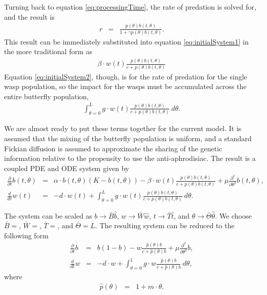 \documentclass[12pt]{article}
\begin{document}
Turning back to equation \ref{eq:processingTime}, the rate of
predation is solved for, and the result is
\begin{eqnarray}
  \label{eq:rateOfPredation}
  r & = &  \frac{p(\theta) b(t,\theta) }{1 + \gamma p(\theta) b(t,\theta)}.
\end{eqnarray}
This result can be immediately substituted into equation
\ref{eq:initialSystem1} in the more traditional form as
\begin{eqnarray}
  \label{eq:butterflyPredationRate}
  \beta \cdot w(t) \frac{p(\theta) b(t,\theta) }{c +  p(\theta) b(t,\theta)}
\end{eqnarray}
Equation \ref{eq:initialSystem2}, though, is for the rate of predation
for the single wasp population, so the impact for the wasps must be
accumulated across the entire butterfly population,
\begin{eqnarray}
  \label{eq:waspPredationRate}
  \int^L_{\theta=0} g \cdot w(t) \frac{p(\theta) b(t,\theta) }{c + p(\theta) b(t,\theta)} ~ d\theta.
\end{eqnarray}

We are almost ready to put these terms together for the current
model. It is assumed that the mixing of the butterfly population is
uniform, and a standard Fickian diffusion is assumed to approximate
the sharing of the genetic information relative to the propensity to
use the anti-aphrodisiac. The result is a coupled PDE and ODE system
given by 
\begin{eqnarray}
  \label{eq:odePDE1}
  \frac{\partial}{\partial t} b(t,\theta) & = &
      \alpha \cdot b(t,\theta) (K - b(t,\theta))
      - \beta \cdot w(t) \frac{p(\theta) b(t,\theta)}{c+p(\theta)b(t,\theta)}
      + \mu \frac{\partial^2}{\partial \theta^2} b(t,\theta) , \\
  \label{eq:odePDE2}
  \frac{d}{dt} w(t) & = & -d \cdot w(t) +
      \int^L_{\theta=0} g \cdot w(t) \frac{p(\theta) b(t,\theta) }{c + p(\theta) b(t,\theta)} ~ d\theta.
\end{eqnarray}

The system can be scaled as $b\rightarrow \bar{B}\hat{b}$,
$w\rightarrow \bar{W}\hat{w}$, $t\rightarrow \bar{T}\hat{t}$, and
$\theta\rightarrow \bar{\Theta}\hat{\theta}$. We choose $\bar{B}=$,
$\bar{W}=$, $\bar{T}=$, and $\bar{\Theta}=L$. The resulting system
can be reduced to the following form
\begin{eqnarray}
  \label{eq:scaledodePDE1}
  \frac{\partial}{\partial t} b & = &
      b (1 - b)
      -  w \frac{\hat{p}(\theta) b}{c+\hat{p}(\theta)b}
      + \mu \frac{\partial^2}{\partial \theta^2} b , \\
  \label{eq:scaledodePDE2}
  \frac{d}{dt} w & = & -d \cdot w +
      \int^1_{\theta=0} g \cdot w \frac{\hat{p}(\theta) b }{c + \hat{p}(\theta) b} ~ d\theta,
\end{eqnarray}
where
\begin{eqnarray}
  \hat{p}(\theta) & = & 1 + m \cdot \theta.
\end{eqnarray}
\end{document}
